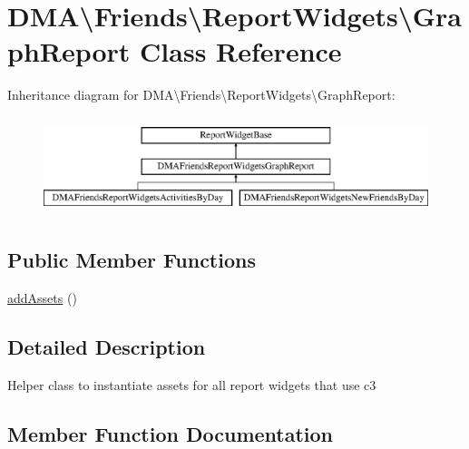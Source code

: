 \hypertarget{classDMA_1_1Friends_1_1ReportWidgets_1_1GraphReport}{}\section{D\+M\+A\textbackslash{}Friends\textbackslash{}Report\+Widgets\textbackslash{}Graph\+Report Class Reference}
\label{classDMA_1_1Friends_1_1ReportWidgets_1_1GraphReport}
Inheritance diagram for D\+M\+A\textbackslash{}Friends\textbackslash{}Report\+Widgets\textbackslash{}Graph\+Report\+:\begin{figure}[H]
\begin{center}
\leavevmode
\includegraphics[height=2.886598cm]{d1/d31/classDMA_1_1Friends_1_1ReportWidgets_1_1GraphReport}
\end{center}
\end{figure}
\subsection*{Public Member Functions}
\begin{DoxyCompactItemize}
\item 
\hyperlink{classDMA_1_1Friends_1_1ReportWidgets_1_1GraphReport_a750a6e7451bc98f22bdb38e3ad091bb7}{add\+Assets} ()
\end{DoxyCompactItemize}


\subsection{Detailed Description}
Helper class to instantiate assets for all report widgets that use c3 

\subsection{Member Function Documentation}
\hypertarget{classDMA_1_1Friends_1_1ReportWidgets_1_1GraphReport_a750a6e7451bc98f22bdb38e3ad091bb7}{}
